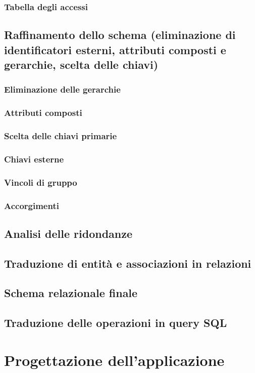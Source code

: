 \documentclass[a4paper,12pt]{report}
\begin{document}
	\subsection{Tabella degli accessi}
	\section{Raffinamento dello schema (eliminazione di identificatori esterni, attributi composti e gerarchie, scelta delle chiavi)}
	\subsection{Eliminazione delle gerarchie}
	\subsection{Attributi composti}
	\subsection{Scelta delle chiavi primarie}
	\subsection{Chiavi esterne}
	\subsection{Vincoli di gruppo}
	\subsection{Accorgimenti}
	\section{Analisi delle ridondanze}
	\section{Traduzione di entità e associazioni in relazioni}
	\section{Schema relazionale finale}
	\section{Traduzione delle operazioni in query SQL}
	\chapter{Progettazione dell'applicazione}
	
\end{document}
